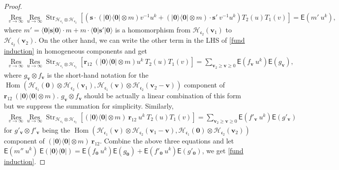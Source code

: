\documentclass[10pt]{amsart}
\theoremstyle{definition}
\numberwithin{equation}{section}
\newcommand{\bv}{\mathbf{v}}
\newcommand{\cH}{\mathcal{H}}
\newcommand{\Hom}{\operatorname{Hom}}
\newcommand{\Res}{\operatorname{Res}}
\newcommand{\str}{\operatorname{Str}}
\begin{document}
\begin{proof}
\begin{align*}
    \underset{v\to \infty}{\Res}\underset{u\to \infty}{\Res}\str_{\cH_{\mathfrak{c}_1}\otimes \cH_{\mathfrak{c}_2}}
\left[\left(\pmb s\cdot(|\mathbf 0\rangle\langle\mathbf 0| \otimes m)v^{-1}u^k+(|\mathbf 0\rangle\langle\mathbf 0| \otimes m)\cdot \pmb s'\:v^{-1}u^k\right)T_2(u)T_{1}(v)\right]=\mathsf E\left(m'\:u^k \right),
\end{align*}
where $m'=\langle\mathbf 0|\pmb s |\mathbf 0\rangle \cdot m+m\cdot\langle\mathbf 0|\pmb s' |\mathbf 0\rangle$ is a homomorphism from $\cH_{\mathfrak{c}_2}(\bv_1)$ to $\cH_{\mathfrak{c}_2}(\bv_2)$. On the other hand, we can write the other term in the LHS of \eqref{fund induction} in homogeneous components and get 
\begin{align*}
    \underset{v\to \infty}{\Res}\underset{u\to \infty}{\Res}\str_{\cH_{\mathfrak{c}_1}\otimes \cH_{\mathfrak{c}_2}}
\left[\pmb r_{12}\:(|\mathbf 0\rangle\langle\mathbf 0| \otimes m)u^{k}\:T_2(u)T_{1}(v)\right]=\sum_{\bv_2\geqslant\bv\geqslant 0}\mathsf E(f_{\bv}\: u^{k})\mathsf E(g_{\bv}),
\end{align*}
where $g_{\bv}\otimes f_{\bv}$ is the short-hand notation for the $\Hom(\cH_{\mathfrak{c}_1}(\mathbf 0)\otimes \cH_{\mathfrak{c}_2}(\bv_1),\cH_{\mathfrak{c}_1}(\bv)\otimes \cH_{\mathfrak{c}_2}(\bv_2-\bv))$ component of $\pmb r_{12}\:(|\mathbf 0\rangle\langle\mathbf 0| \otimes m)$. $g_{\bv}\otimes f_{\bv}$ should be actually a linear combination of this form but we suppress the summation for simplicity. Similarly,
\begin{align*}
    \underset{v\to \infty}{\Res}\underset{u\to \infty}{\Res}\str_{\cH_{\mathfrak{c}_1}\otimes \cH_{\mathfrak{c}_2}}
\left[(|\mathbf 0\rangle\langle\mathbf 0| \otimes m)\:\pmb r_{12}\:u^{k}\:T_2(u)T_{1}(v)\right]=\sum_{\bv_2\geqslant\bv\geqslant 0}\mathsf E(f'_{\bv}\: u^{k})\mathsf E(g'_{\bv})
\end{align*}
for $g'_{\bv}\otimes f'_{\bv}$ being the $\Hom(\cH_{\mathfrak{c}_1}(\bv)\otimes \cH_{\mathfrak{c}_2}(\bv_1-\bv),\cH_{\mathfrak{c}_1}(\mathbf 0)\otimes \cH_{\mathfrak{c}_2}(\bv_2))$ component of $(|\mathbf 0\rangle\langle\mathbf 0| \otimes m)\:\pmb r_{12}$. Combine the above three equations and let $\mathsf E(m''\: u^{k})\:\mathsf E(|\mathbf 0\rangle\langle\mathbf 0|)=\mathsf E(f_{\mathbf 0}\: u^{k})\mathsf E(g_{\mathbf 0})+\mathsf E(f'_{\mathbf 0}\: u^{k})\mathsf E(g'_{\mathbf 0})$, we get \eqref{fund induction}.
\end{proof}
\end{document}
